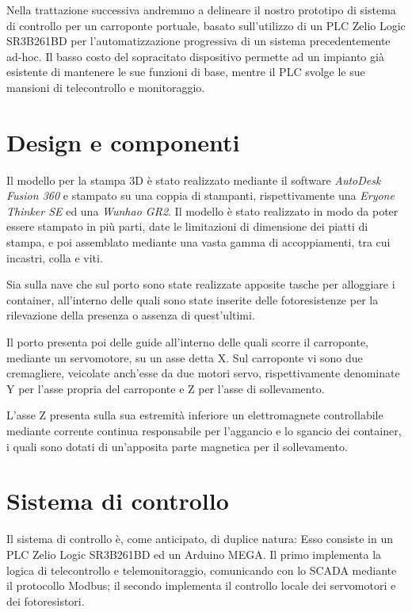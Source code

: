 Nella trattazione successiva andremmo a delineare il nostro prototipo di sistema di
controllo per un carroponte portuale, basato sull'utilizzo di un PLC Zelio Logic SR3B261BD per
l'automatizzazione progressiva di un sistema precedentemente ad-hoc. Il basso costo del sopracitato
dispositivo permette ad un impianto già esistente di mantenere le sue funzioni di base, mentre il
PLC svolge le sue mansioni di telecontrollo e monitoraggio.


\section{Design e componenti}

Il modello per la stampa 3D è stato realizzato mediante il software \emph{AutoDesk Fusion 360} e
stampato su una coppia di stampanti, rispettivamente una \emph{Eryone Thinker SE} ed una
\emph{Wunhao GR2}. Il modello è stato realizzato in modo da poter essere stampato in più parti, date
le limitazioni di dimensione dei piatti di stampa, e poi assemblato mediante una vasta gamma di
accoppiamenti, tra cui incastri, colla e viti.

Sia sulla nave che sul porto sono state realizzate apposite tasche per alloggiare i container,
all'interno delle quali sono state inserite delle fotoresistenze per la rilevazione della presenza o
assenza di quest'ultimi.

Il porto presenta poi delle guide all'interno delle quali scorre il carroponte, mediante un
servomotore, su un asse detta X. Sul carroponte vi sono due cremagliere, veicolate anch'esse da due
motori servo, rispettivamente denominate Y per l'asse propria del carroponte e Z per l'asse di
sollevamento.

L'asse Z presenta sulla sua estremità inferiore un elettromagnete controllabile mediante corrente
continua responsabile per l'aggancio e lo sgancio dei container, i quali sono dotati di un'apposita
parte magnetica per il sollevamento.

\section{Sistema di controllo}

Il sistema di controllo è, come anticipato, di duplice natura: Esso consiste in un PLC Zelio Logic
SR3B261BD ed un Arduino MEGA. Il primo implementa la logica di telecontrollo e
telemonitoraggio, comunicando con lo SCADA mediante il protocollo Modbus; il secondo implementa il
controllo locale dei servomotori e dei fotoresistori.

